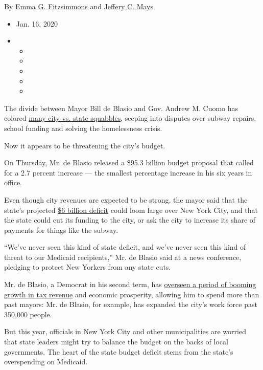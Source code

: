By \href{https://www.nytimes3xbfgragh.onion/by/emma-g-fitzsimmons}{Emma
G. Fitzsimmons} and
\href{https://www.nytimes3xbfgragh.onion/by/jeffery-c-mays}{Jeffery C.
Mays}

\begin{itemize}
\item
  Jan. 16, 2020
\item
  \begin{itemize}
  \item
  \item
  \item
  \item
  \item
  \end{itemize}
\end{itemize}

The divide between Mayor Bill de Blasio and Gov. Andrew M. Cuomo has
colored
\href{https://www.nytimes3xbfgragh.onion/2018/04/22/nyregion/cuomo-deblasio-feud-nyc.html}{many
city vs. state squabbles}, seeping into disputes over subway repairs,
school funding and solving the homelessness crisis.

Now it appears to be threatening the city's budget.

On Thursday, Mr. de Blasio released a \$95.3 billion budget proposal
that called for a 2.7 percent increase --- the smallest percentage
increase in his six years in office.

Even though city revenues are expected to be strong, the mayor said that
the state's projected
\href{https://www.nytimes3xbfgragh.onion/2019/12/20/nyregion/democrats-progressive-ny-budget.html}{\$6
billion deficit} could loom large over New York City, and that the state
could cut its funding to the city, or ask the city to increase its share
of payments for things like the subway.

``We've never seen this kind of state deficit, and we've never seen this
kind of threat to our Medicaid recipients,'' Mr. de Blasio said at a
news conference, pledging to protect New Yorkers from any state cuts.

Mr. de Blasio, a Democrat in his second term, has
\href{https://www.nytimes3xbfgragh.onion/2018/02/01/nyregion/nyc-de-blasio-budget-spending.html}{overseen
a period of booming growth in tax revenue} and economic prosperity,
allowing him to spend more than past mayors: Mr. de Blasio, for example,
has expanded the city's work force past 350,000 people.

But this year, officials in New York City and other municipalities are
worried that state leaders might try to balance the budget on the backs
of local governments. The heart of the state budget deficit stems from
the state's overspending on Medicaid.

